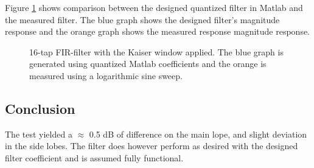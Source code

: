 Figure \ref{Fig:FIRComparison} shows comparison between the designed quantized filter in Matlab and the measured filter. The blue graph shows the designed filter's magnitude response  and the orange graph shows the measured response magnitude response. %
	
%	

\begin{figure}[H]
	\centering
	
	\caption{16-tap FIR-filter with the Kaiser window applied. The blue graph is generated using quantized Matlab coefficients and the orange is measured using a logarithmic sine sweep.} 
	\label{Fig:FIRComparison}
\end{figure}

\subsection{Conclusion}
The test yielded a $\approx$ 0.5 dB of difference on the main lope, and slight deviation in the side lobes. The filter does however perform as desired with the designed filter coefficient and is assumed fully functional.



